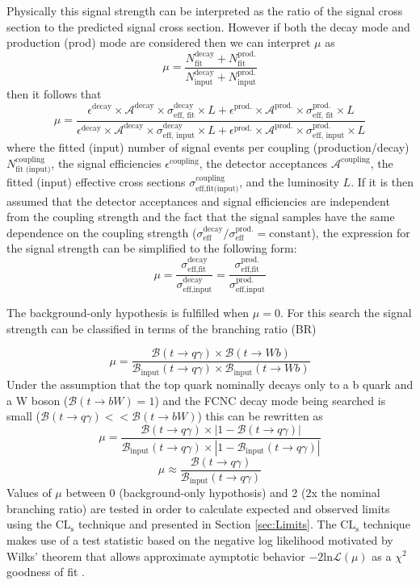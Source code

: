 Physically this signal strength can be interpreted as the ratio of the signal cross section to the predicted signal cross section.  However if both the decay mode and production (prod) mode are considered then we can interpret $\mu$ as 
\[\mu = \frac{N_\text{fit}^\text{decay} + N_\text{fit}^\text{prod.}}{N_\text{input}^\text{decay} + N_\text{input}^\text{prod.}}
\]then it follows that 
\[\mu = \frac{\epsilon^\text{decay}\times \mathcal{A}^\text{decay} \times \sigma^\text{decay}_\text{eff, fit}\times L+\epsilon^\text{prod.}\times \mathcal{A}^\text{prod.} \times \sigma^\text{prod.}_\text{eff, fit} \times L}{\epsilon^\text{decay}\times \mathcal{A}^\text{decay} \times \sigma^\text{decay}_\text{eff, input} \times L+\epsilon^\text{prod.}\times \mathcal{A}^\text{prod.} \times \sigma^\text{prod.}_\text{eff, input}\times L}
\]
where the fitted (input) number of signal events per coupling (production/decay) $N_\text{fit (input)}^\text{coupling}$, the signal efficiencies $\epsilon^\text{coupling}$, the detector acceptances $\mathcal{A}^\text{coupling}$, the fitted (input) effective cross sections $\sigma_\text{eff,fit(input)}^\text{coupling}$, and the luminosity $L$.  If it is then assumed that the detector acceptances and signal efficiencies are independent from the coupling strength and the fact that the signal samples have the same dependence on the coupling strength ($\sigma_\text{eff}^\text{decay}/ \sigma_\text{eff}^\text{prod.} = \text{constant}$), the expression for the signal strength can be simplified to the following form:
\[ \mu = \frac{\sigma_\text{eff,fit}^\text{decay}}{\sigma_\text{eff,input}^\text{decay}}=\frac{\sigma_\text{eff,fit}^\text{prod.}}{\sigma_\text{eff,input}^\text{prod.}}
\]

The background-only hypothesis is fulfilled when $\mu=0$.
For this search the signal strength can be classified in terms of the branching ratio (BR)

\[ \mu = \frac{\mathcal{B}(t\rightarrow q\gamma) \times \mathcal{B}(t\rightarrow Wb)}{\mathcal{B}_\text{input}(t\rightarrow q\gamma) \times \mathcal{B}_\text{input}(t\rightarrow Wb)}
\]
Under the assumption that the top quark nominally decays only to a b quark and a W boson ($\mathcal{B}(t\rightarrow bW)=1$) and the FCNC decay mode being searched is small ($\mathcal{B}(t\rightarrow q\gamma) << \mathcal{B}(t\rightarrow bW)$) this can be rewritten as 
\[ \mu = \frac{\mathcal{B}(t\rightarrow q\gamma) \times|1-\mathcal{B}(t\rightarrow q\gamma)|}{\mathcal{B}_\text{input}(t\rightarrow q\gamma) \times|1-\mathcal{B}_\text{input}(t\rightarrow q\gamma)|}
\]
\[ \mu \approx \frac{\mathcal{B}(t\rightarrow q\gamma)}{\mathcal{B}_\text{input}(t\rightarrow q\gamma)}
\]
Values of $\mu$ between 0 (background-only hypothosis) and 2 (2x the nominal branching ratio) are tested in order to calculate expected and observed limits using the $\text{CL}_\text{s}$ technique\cite{Read:2002hq} and presented in Section \ref{sec:Limits}.  The $\text{CL}_\text{s}$ technique makes use of a test statistic based on the negative log likelihood motivated by  Wilks' theorem that allows approximate aymptotic behavior $-2 \text{ln} \mathcal{L}(\mu)$ as a $\chi^2$ goodness of fit \cite{Wilks:1938dza}. %




